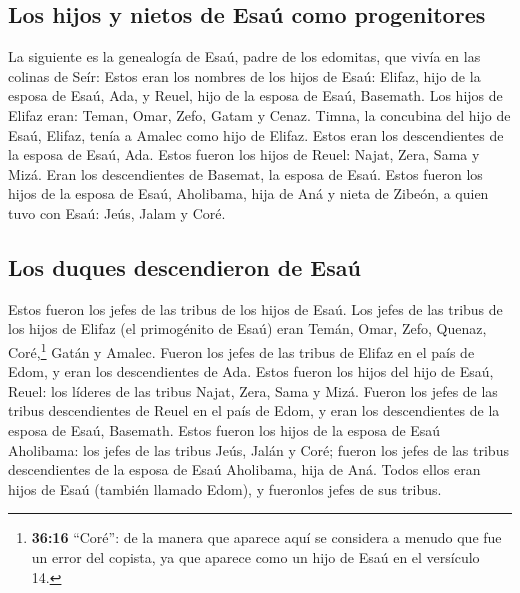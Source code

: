\hypertarget{los-hijos-y-nietos-de-esauxfa-como-progenitores}{%
\subsection{Los hijos y nietos de Esaú como
progenitores}\label{los-hijos-y-nietos-de-esauxfa-como-progenitores}}

 La siguiente es la genealogía de Esaú, padre de los
edomitas, que vivía en las colinas de Seír:  Estos eran
los nombres de los hijos de Esaú: Elifaz, hijo de la esposa de Esaú,
Ada, y Reuel, hijo de la esposa de Esaú, Basemath.  Los
hijos de Elifaz eran: Teman, Omar, Zefo, Gatam y Cenaz. 
Timna, la concubina del hijo de Esaú, Elifaz, tenía a Amalec como hijo
de Elifaz. Estos eran los descendientes de la esposa de Esaú, Ada.
 Estos fueron los hijos de Reuel: Najat, Zera, Sama y
Mizá. Eran los descendientes de Basemat, la esposa de Esaú.
 Estos fueron los hijos de la esposa de Esaú, Aholibama,
hija de Aná y nieta de Zibeón, a quien tuvo con Esaú: Jeús, Jalam y
Coré.

\hypertarget{los-duques-descendieron-de-esauxfa}{%
\subsection{Los duques descendieron de
Esaú}\label{los-duques-descendieron-de-esauxfa}}

 Estos fueron los jefes de las tribus de los hijos de
Esaú. Los jefes de las tribus de los hijos de Elifaz (el primogénito de
Esaú) eran Temán, Omar, Zefo, Quenaz,  Coré,\footnote{\textbf{36:16}
  ``Coré'': de la manera que aparece aquí se considera a menudo que fue
  un error del copista, ya que aparece como un hijo de Esaú en el
  versículo 14.} Gatán y Amalec. Fueron los jefes de las tribus de
Elifaz en el país de Edom, y eran los descendientes de Ada.
 Estos fueron los hijos del hijo de Esaú, Reuel: los
líderes de las tribus Najat, Zera, Sama y Mizá. Fueron los jefes de las
tribus descendientes de Reuel en el país de Edom, y eran los
descendientes de la esposa de Esaú, Basemath.  Estos
fueron los hijos de la esposa de Esaú Aholibama: los jefes de las tribus
Jeús, Jalán y Coré; fueron los jefes de las tribus descendientes de la
esposa de Esaú Aholibama, hija de Aná.  Todos ellos eran
hijos de Esaú (también llamado Edom), y fueronlos jefes de sus tribus.

